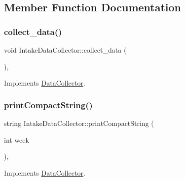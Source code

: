 \subsection{Member Function Documentation}
\mbox{\label{classIntakeDataCollector_aed1610e5419465b35041b05b9f60c212_aed1610e5419465b35041b05b9f60c212}} 
\subsubsection{\texorpdfstring{collect\+\_\+data()}{collect\_data()}}
{\footnotesize\ttfamily void Intake\+Data\+Collector\+::collect\+\_\+data (\begin{DoxyParamCaption}{ }\end{DoxyParamCaption})\hspace{0.3cm}{\ttfamily [override]}, {\ttfamily [virtual]}}



Implements \mbox{\hyperlink{classDataCollector_a01486bf58acbe37b203f97b3b9a79c40_a01486bf58acbe37b203f97b3b9a79c40}{Data\+Collector}}.

\mbox{\label{classIntakeDataCollector_ac39a40726fd4fe887425b24a10f04034_ac39a40726fd4fe887425b24a10f04034}} 
\subsubsection{\texorpdfstring{print\+Compact\+String()}{printCompactString()}}
{\footnotesize\ttfamily string Intake\+Data\+Collector\+::print\+Compact\+String (\begin{DoxyParamCaption}\item[{int}]{week }\end{DoxyParamCaption})\hspace{0.3cm}{\ttfamily [override]}, {\ttfamily [virtual]}}



Implements \mbox{\hyperlink{classDataCollector_a2eac264fa5612aed5a830b12de4f4ae3_a2eac264fa5612aed5a830b12de4f4ae3}{Data\+Collector}}.

